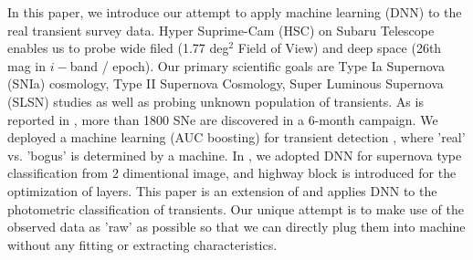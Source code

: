 \documentclass[useamsfonts]{pasj01}
\begin{document}
In this paper, we introduce our attempt to apply machine learning (DNN) to the real transient survey data.
Hyper Suprime-Cam (HSC) on Subaru Telescope enables us to probe wide filed (1.77 deg$^2$ Field of View) and deep space (26th mag in $i-$band / epoch).  Our primary scientific goals are Type Ia Supernova (SNIa) cosmology, Type II Supernova Cosmology, Super Luminous Supernova (SLSN) studies as well as probing unknown population of transients.  
As is reported in \citet{yasuda19a}, more than 1800 SNe are discovered in a 6-month campaign. 
We deployed a machine learning (AUC boosting) for transient detection \citep{morii16a}, where 'real' vs. 'bogus' is determined by a machine.
In \citet{kimura17a}, we adopted DNN for supernova type classification from 2 dimentional image, and highway block is introduced for the optimization of layers.
This paper is an extension of \citet{kimura17a} and applies DNN to the photometric classification of transients.   
Our unique attempt is to make use of the observed data as 'raw' as possible so that we can directly plug them into machine without any fitting or extracting characteristics.
 
%
\end{document}
